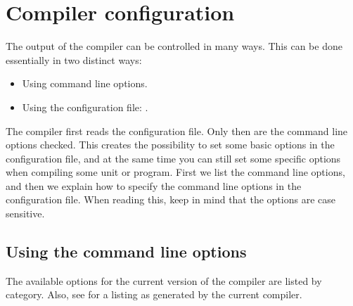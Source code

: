 \chapter{Compiler configuration}
\label{ch:CompilerConfiguration}

The output of the compiler can be controlled in many ways. This can be done
essentially in two distinct ways:
\begin{itemize}
\item Using command line options.
\item Using the configuration file: .
\end{itemize}
The compiler first reads the configuration file. Only then are the command line
options checked. This creates the possibility to set some basic options
in the configuration file, and at the same time you can still set some
specific options when compiling some unit or program. First we list the
command line options, and then we explain how to specify the command
line options in the configuration file. When reading this, keep in mind
that the options are case sensitive.


\section{Using the command line options}

The available options for the current version of the compiler are listed by
category. Also, see  for a listing as generated by
the current compiler.

%
%

